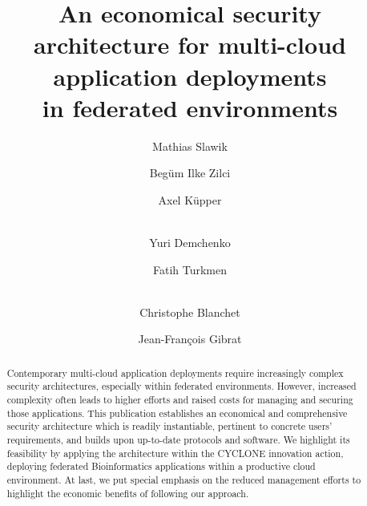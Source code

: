 \documentclass{llncs}
\begin{document}
\pagestyle{headings} 
\mainmatter              %

\title{An economical security architecture for multi-cloud application deployments\\ in federated environments}


\author{Mathias Slawik \and Begüm Ilke Zilci \and Axel Küpper \and\\ Yuri Demchenko \and Fatih Turkmen  \and \\Christophe Blanchet \and Jean-François Gibrat}



\maketitle              %

\begin{abstract}
Contemporary multi-cloud application deployments require increasingly complex security architectures, especially within federated environments. However, increased complexity often leads to higher efforts and raised costs for managing and securing those applications. This publication establishes an economical and comprehensive security architecture which is readily instantiable, pertinent to concrete users' requirements, and builds upon up-to-date protocols and software. We highlight its feasibility by applying the architecture within the CYCLONE innovation action, deploying federated Bioinformatics applications within a productive cloud environment. At last, we put special emphasis on the reduced management efforts to highlight the economic benefits of following our approach.
\end{abstract}
\end{document}
